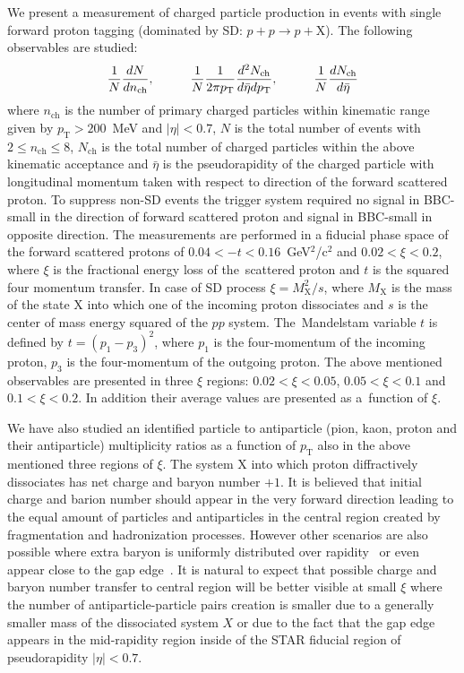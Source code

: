 We present a measurement of charged particle production in events with single forward proton tagging (dominated by \ac{SD}: $p+p\to p+\textrm{X}$). The following observables are studied:
\begin{equation}
\frac{1}{N}\frac{dN}{dn_\textrm{ch}},\textrm{\hspace{1cm}} 
\frac{1}{N}\frac{1}{2\pi p_\textrm{T}}\frac{d^2N_\textrm{ch}}{d\bar{\eta}dp_\textrm{T}},\textrm{\hspace{1cm}} 
\frac{1}{N}\frac{dN_\textrm{ch}}{d\bar{\eta}}
\end{equation}
where $n_\textrm{ch}$ is the number of primary charged particles within kinematic range given by $p_\textrm{T}>200$~MeV and $|\eta|<0.7$, $N$ is the 
total number of events with $2\leq n_\textrm{ch}\leq8$, $N_\textrm{ch}$ is the total number of charged particles within the above kinematic acceptance and $\bar{\eta}$ is the pseudorapidity of the charged particle with longitudinal momentum taken with respect to direction of the forward scattered proton. To suppress non-SD events the trigger system required no signal in BBC-small in the direction of forward scattered proton and signal in BBC-small in opposite direction. The 
measurements are performed in a fiducial phase space of the forward scattered protons of $0.04<-t<0.16$~GeV$^2$/c$^2$ and 
$0.02<\xi<0.2$, where $\xi$ is the fractional energy loss of the~scattered proton and $t$ is the squared four momentum transfer. In case of SD process $\xi=M^2_\textrm{X}/s$, where $M_\textrm{X}$ is 
the mass of the state $\textrm{X}$ into which one of the incoming proton dissociates and $s$ is the center of mass energy squared of the $pp$ system. The~Mandelstam variable $t$ is defined by $t=(p_1-p_3)^2$,  where $p_1$ is the four-momentum of the incoming proton, $p_3$ is the four-momentum of the outgoing proton. The above mentioned observables are presented in three $\xi$ 
regions: $0.02<\xi<0.05$, $0.05<\xi<0.1$ and $0.1<\xi<0.2$. In addition their average values are presented as a~function of $\xi$.



We have also studied an identified particle to antiparticle (pion, kaon, proton and their antiparticle) multiplicity ratios as a function of $p_\textrm{T}$ also in the above mentioned three regions of $\xi$. The system $\textrm{X}$ into which proton diffractively dissociates has net charge and baryon number $+1$. It is believed that initial charge and barion number should appear in the very forward direction leading to the equal amount of particles and antiparticles in the central region created by fragmentation and hadronization processes. However other scenarios are also possible where extra baryon is uniformly distributed over rapidity~\cite{Kopeliovich:1988qm} or even appear close to the gap edge~\cite{Bopp:2000vg}. It is natural to expect that possible charge and baryon number transfer to central region will be better visible at small $\xi$ where the number of antiparticle-particle pairs creation is smaller due to a generally smaller mass of the dissociated system $X$ or due to the fact that the gap edge appears in the mid-rapidity region inside of the STAR fiducial region of pseudorapidity $|\eta|<0.7$.
